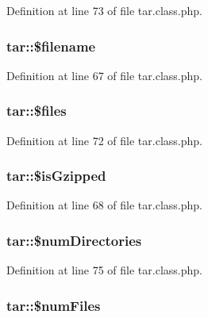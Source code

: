 Definition at line 73 of file tar.\+class.\+php.

\hypertarget{classtar_af99384023359a00770ca0ffb858b21fb}{
\subsubsection[{\$filename}]{\setlength{\rightskip}{0pt plus 5cm}tar\+::\$filename}}\label{classtar_af99384023359a00770ca0ffb858b21fb}


Definition at line 67 of file tar.\+class.\+php.

\hypertarget{classtar_a2082ab6894219b27e42024e925c4e11f}{
\subsubsection[{\$files}]{\setlength{\rightskip}{0pt plus 5cm}tar\+::\$files}}\label{classtar_a2082ab6894219b27e42024e925c4e11f}


Definition at line 72 of file tar.\+class.\+php.

\hypertarget{classtar_a82771381c948bca4c166212276fe4b46}{
\subsubsection[{\$is\+Gzipped}]{\setlength{\rightskip}{0pt plus 5cm}tar\+::\$is\+Gzipped}}\label{classtar_a82771381c948bca4c166212276fe4b46}


Definition at line 68 of file tar.\+class.\+php.

\hypertarget{classtar_a2406f376692c41ad3e3a62cf473738ec}{
\subsubsection[{\$num\+Directories}]{\setlength{\rightskip}{0pt plus 5cm}tar\+::\$num\+Directories}}\label{classtar_a2406f376692c41ad3e3a62cf473738ec}


Definition at line 75 of file tar.\+class.\+php.

\hypertarget{classtar_a03d688d94a5fa92720ff9b1c03e7c157}{
\subsubsection[{\$num\+Files}]{\setlength{\rightskip}{0pt plus 5cm}tar\+::\$num\+Files}}\label{classtar_a03d688d94a5fa92720ff9b1c03e7c157}


